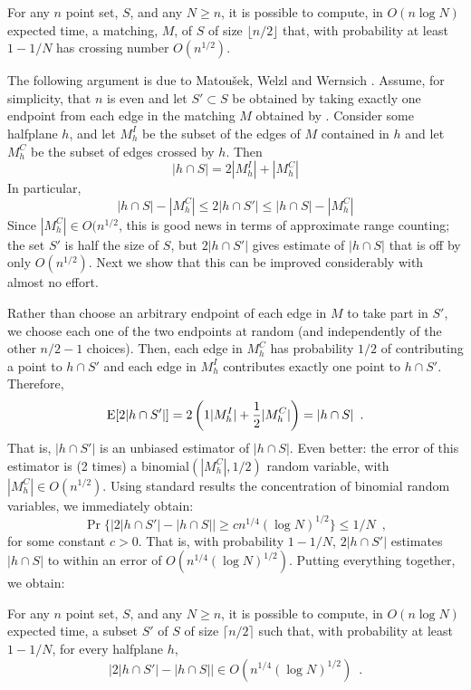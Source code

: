 \documentclass{patmorin}
\begin{document}
\begin{cor}
  For any $n$ point set, $S$, and any $N\ge n$, it is possible to
  compute, in $O(n\log N)$ expected time, a matching, $M$, of $S$ of
  size $\lfloor n/2\rfloor$ that, with probability at least $1-1/N$
  has crossing number $O(n^{1/2})$.
\end{cor}

The following argument is due to Matou\v{s}ek, Welzl and Wernsich
\cite[Lemma~2.5]{mww93}.  Assume, for simplicity, that $n$ is even and let
$S'\subset S$ be obtained by taking exactly one endpoint from each edge in
the matching $M$ obtained by .  Consider some halfplane
$h$,  and let $M^{I}_h$ be the subset of the edges of $M$ contained in
$h$ and let $M^{C}_h$ be the subset of edges crossed by $h$. Then
\[
     |h\cap S| = 2|M^{I}_h| + |M^{C}_h|
\] 
In particular,
\[
     |h\cap S|- |M^{C}_h| \le 2|h\cap S'| \le |h\cap S|- |M^{C}_h| 
\]
Since $|M^C_h|\in O(n^{1/2}$, this is good news in terms of approximate
range counting;  the set $S'$ is half the size of $S$, but $2|h\cap
S'|$ gives estimate of $|h\cap S|$ that is off by only $O(n^{1/2})$.
Next we show that this can be improved considerably with almost no effort.

Rather than choose an arbitrary endpoint of each edge in $M$ to
take part in $S'$, we choose each one of the two endpoints at random
(and independently of the other $n/2-1$ choices).  Then, each edge in
$M^{C}_h$ has probability $1/2$ of contributing a point to $h\cap S'$
and each edge in $M^{I}_h$ contributes exactly one point to $h\cap S'$.
Therefore,
\[
    \mathrm{E}[2|h\cap S'|]
      = 2\left(1|M^{I}_h| + \frac{1}{2}|M^{C}_h|\right) = |h\cap S| \enspace .
\]
That is, $|h\cap S'|$ is an unbiased estimator of $|h\cap
S|$.  Even better: the error of this estimator is (2 times) a
binomial$(|M^{C}_h|,1/2)$ random variable, with $|M^{C}_h|\in
O(n^{1/2})$.  Using standard results the concentration of binomial random
variables, we immediately obtain:
\[
   \Pr\{\left|2|h \cap S'| - |h\cap S|\right| \ge c n^{1/4}(\log N)^{1/2}\} 
       \le 1/N \enspace ,
\]
for some constant $c>0$.  That is, with probability $1-1/N$, $2|h\cap S'|$
estimates $|h\cap S|$ to within an error of $O(n^{1/4}(\log N)^{1/2})$.
Putting everything together, we obtain:

\begin{lem}
  For any $n$ point set, $S$, and any $N\ge n$, it is possible to
  compute, in $O(n\log N)$ expected time, a subset $S'$ of $S$ of 
  size $\lceil n/2\rceil$ such that, 
  with probability at least $1-1/N$, for every halfplane $h$,
  \[
     \left|2|h\cap S'| - |h\cap S|\right| \in O(n^{1/4}(\log N)^{1/2}) \enspace .
  \]
\end{lem}
\end{document}
